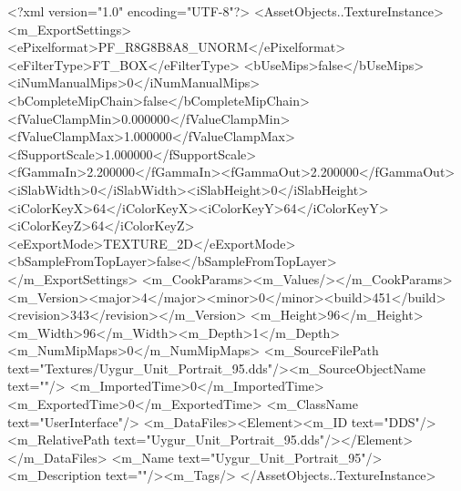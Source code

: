 <?xml version="1.0" encoding="UTF-8"?>
<AssetObjects..TextureInstance>
  <m_ExportSettings>
    <ePixelformat>PF_R8G8B8A8_UNORM</ePixelformat><eFilterType>FT_BOX</eFilterType>
    <bUseMips>false</bUseMips><iNumManualMips>0</iNumManualMips><bCompleteMipChain>false</bCompleteMipChain>
    <fValueClampMin>0.000000</fValueClampMin><fValueClampMax>1.000000</fValueClampMax><fSupportScale>1.000000</fSupportScale>
    <fGammaIn>2.200000</fGammaIn><fGammaOut>2.200000</fGammaOut><iSlabWidth>0</iSlabWidth><iSlabHeight>0</iSlabHeight>
    <iColorKeyX>64</iColorKeyX><iColorKeyY>64</iColorKeyY><iColorKeyZ>64</iColorKeyZ>
    <eExportMode>TEXTURE_2D</eExportMode><bSampleFromTopLayer>false</bSampleFromTopLayer>
  </m_ExportSettings>
  <m_CookParams><m_Values/></m_CookParams>
  <m_Version><major>4</major><minor>0</minor><build>451</build><revision>343</revision></m_Version>
  <m_Height>96</m_Height><m_Width>96</m_Width><m_Depth>1</m_Depth><m_NumMipMaps>0</m_NumMipMaps>
  <m_SourceFilePath text="Textures/Uygur_Unit_Portrait_95.dds"/><m_SourceObjectName text=""/>
  <m_ImportedTime>0</m_ImportedTime><m_ExportedTime>0</m_ExportedTime>
  <m_ClassName text="UserInterface"/>
  <m_DataFiles><Element><m_ID text="DDS"/><m_RelativePath text="Uygur_Unit_Portrait_95.dds"/></Element></m_DataFiles>
  <m_Name text="Uygur_Unit_Portrait_95"/><m_Description text=""/><m_Tags/>
</AssetObjects..TextureInstance>
